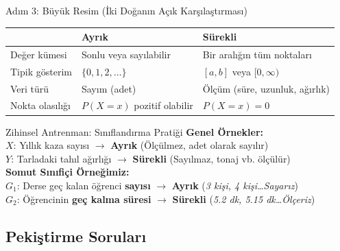 ﻿\documentclass[light]{lutbeamer}
\begin{document}
\begin{frame}{Adım 3: Büyük Resim (İki Doğanın Açık Karşılaştırması)}
\footnotesize
\centering
\begin{tabular}{p{} p{} p{}}
\toprule
 & \textbf{Ayrık} & \textbf{Sürekli} \\
\midrule
Değer kümesi & Sonlu veya sayılabilir & Bir aralığın tüm noktaları \\
Tipik gösterim & $\{0, 1, 2, \dots\}$ & $[a, b]$ veya $[0, \infty)$ \\
Veri türü & Sayım (adet) & Ölçüm (süre, uzunluk, ağırlık) \\
Nokta olasılığı & $P(X=x)$ pozitif olabilir & $P(X=x) = 0$ \\
\bottomrule
\end{tabular}

\vspace{0.3cm}
\begin{block}{Zihinsel Antrenman: Sınıflandırma Pratiği}
  \textbf{Genel Örnekler:} \\
  $X$: Yıllık kaza sayısı $\to$ \textbf{Ayrık} (Ölçülmez, adet olarak sayılır) \\
  $Y$: Tarladaki tahıl ağırlığı $\to$ \textbf{Sürekli} (Sayılmaz, tonaj vb. ölçülür) \\
  
  \vspace{0.15cm}
  {\color{blue!80!black} \textbf{Somut Sınıfiçi Örneğimiz:}} \\
  $G_1$: Derse geç kalan öğrenci \textbf{sayısı} $\to$ \textbf{Ayrık} (\textit{3 kişi, 4 kişi\dots Sayarız}) \\
  $G_2$: Öğrencinin \textbf{geç kalma süresi} $\to$ \textbf{Sürekli} (\textit{5.2 dk, 5.15 dk\dots Ölçeriz})
\end{block}
\end{frame}

\subsection{Pekiştirme Soruları}
\end{document}
